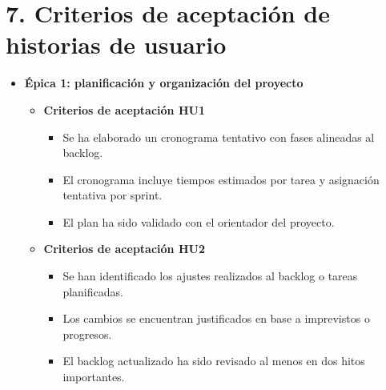 \documentclass[
11pt, %
]{charter}
\begin{document}
\section{7. Criterios de aceptación de historias de usuario}
\label{sec:criteriosAceptacion}

\begin{itemize}
  \item \textbf{Épica 1: planificación y organización del proyecto}
    \begin{itemize}
      \item \textbf{Criterios de aceptación HU1}
      \begin{itemize}
        \item Se ha elaborado un cronograma tentativo con fases alineadas al backlog.
        \item El cronograma incluye tiempos estimados por tarea y asignación tentativa por sprint.
        \item El plan ha sido validado con el orientador del proyecto.
      \end{itemize}

      \item \textbf{Criterios de aceptación HU2}
      \begin{itemize}
        \item Se han identificado los ajustes realizados al backlog o tareas planificadas.
        \item Los cambios se encuentran justificados en base a imprevistos o progresos.
        \item El backlog actualizado ha sido revisado al menos en dos hitos importantes.
      \end{itemize}
    \end{itemize}
    

\end{itemize}
\end{document}
